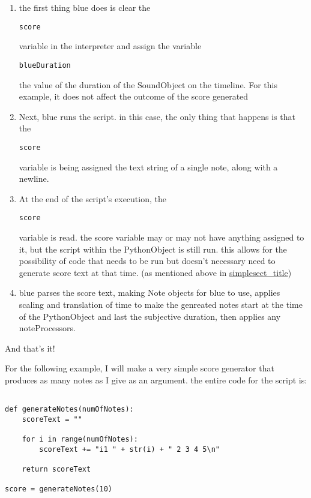 \begin{enumerate}
\def\labelenumi{\arabic{enumi}.}
\item
  the first thing blue does is clear the

\begin{verbatim}
score
\end{verbatim}

  variable in the interpreter and assign the variable

\begin{verbatim}
blueDuration
\end{verbatim}

  the value of the duration of the SoundObject on the timeline. For this
  example, it does not affect the outcome of the score generated
\item
  Next, blue runs the script. in this case, the only thing that happens
  is that the

\begin{verbatim}
score
\end{verbatim}

  variable is being assigned the text string of a single note, along
  with a newline.
\item
  At the end of the script's execution, the

\begin{verbatim}
score
\end{verbatim}

  variable is read. the score variable may or may not have anything
  assigned to it, but the script within the PythonObject is still run.
  this allows for the possibility of code that needs to be run but
  doesn't necessary need to generate score text at that time. (as
  mentioned above in
  \protect\hyperlink{caseUsingPython}{simplesect\_title})
\item
  blue parses the score text, making Note objects for blue to use,
  applies scaling and translation of time to make the genreated notes
  start at the time of the PythonObject and last the subjective
  duration, then applies any noteProcessors.
\end{enumerate}

And that's it!

For the following example, I will make a very simple score generator
that produces as many notes as I give as an argument. the entire code
for the script is:

\begin{verbatim}
 
def generateNotes(numOfNotes):
    scoreText = ""
    
    for i in range(numOfNotes):
        scoreText += "i1 " + str(i) + " 2 3 4 5\n"
    
    return scoreText

score = generateNotes(10)
\end{verbatim}

